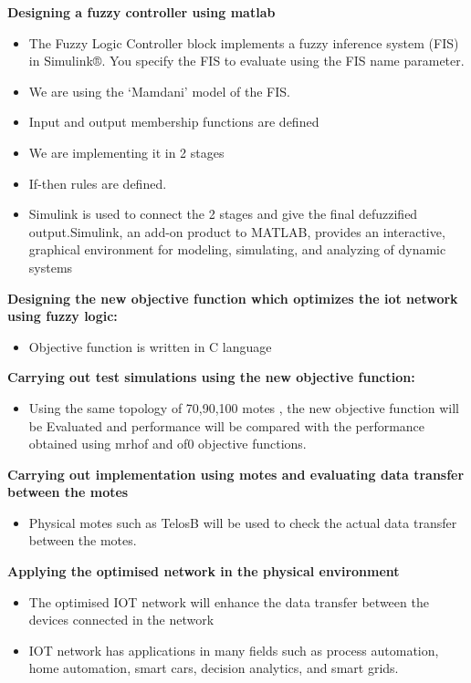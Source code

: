 \noindent\textbf{Designing a fuzzy controller using matlab\\
}\vspace{-1cm}
\begin{itemize}
\item The Fuzzy Logic Controller block implements a fuzzy inference system (FIS) in Simulink®. You specify the FIS to evaluate using the FIS name parameter.
\item We are using the ‘Mamdani’ model of the FIS.
\item Input and output membership functions are defined
\item We are implementing it in 2 stages
\item If-then rules are defined.
\item Simulink is used to connect the 2 stages and give the final defuzzified output.Simulink, an add-on product to MATLAB, provides an interactive, graphical environment for modeling, simulating, and analyzing of dynamic systems
\end{itemize}


\noindent\textbf{Designing the new objective function which optimizes the iot network using fuzzy logic:\\
}
\vspace{-1cm}
\begin{itemize}
\item Objective function is written in C language
\end{itemize}
\noindent\textbf{Carrying out test simulations using the new objective function:\\
}\vspace{-1cm}
\begin{itemize}
\item Using the same topology of 70,90,100 motes , the new objective function will be 
Evaluated and performance will be compared with the performance obtained using mrhof and of0 objective functions.
\end{itemize}
 
\noindent\textbf{Carrying out implementation using motes and evaluating data transfer between the motes} 
\vspace{-1cm}
\begin{itemize}
\item Physical motes such as TelosB will be used to check the actual data transfer between the motes.
\end{itemize}
\noindent\textbf{Applying the optimised network in the physical environment}
\vspace{-1cm}
\begin{itemize}
\item The optimised IOT network will enhance the data transfer between the devices connected in the network
\item IOT network has applications in many fields such as process automation, home automation, smart cars, decision analytics, and smart grids.
\end{itemize}


\newpage
